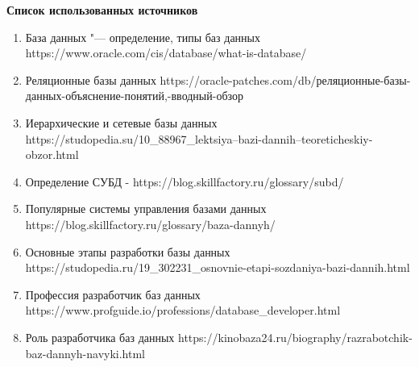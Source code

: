 \begin{flushleft}
    \newpage
    \begin{center}
        \textbf{Список использованных источников}
    \end{center}
    \vspace*{14pt}

    \begin{enumerate}
        \item База данных "--- определение, типы баз данных https://www.oracle.com/cis/database/what-is-database/
        \item Реляционные базы данных https://oracle-patches.com/db/реляционные-базы-данных-объяснение-понятий,-вводный-обзор
        \item Иерархические и сетевые базы данных https://studopedia.su/10\_88967\_lektsiya--bazi-dannih--teoreticheskiy-obzor.html
        \item Определение СУБД - https://blog.skillfactory.ru/glossary/subd/
        \item Популярные системы управления базами данных https://blog.skillfactory.ru/glossary/baza-dannyh/
        \item Основные этапы разработки базы данных https://studopedia.ru/19\_302231\_osnovnie-etapi-sozdaniya-bazi-dannih.html
        \item Профессия разработчик баз данных https://www.profguide.io/professions/database\_developer.html
        \item Роль разработчика баз данных https://kinobaza24.ru/biography/razrabotchik-baz-dannyh-navyki.html
    \end{enumerate}

\end{flushleft}

